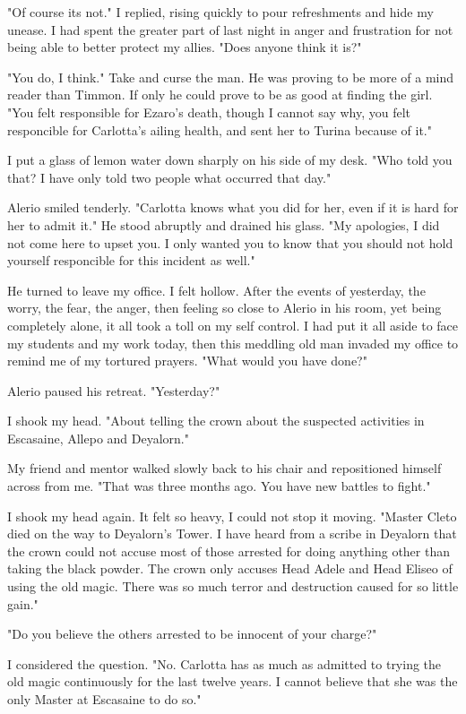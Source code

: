 \documentclass{article}
\begin{document}
"Of course its not." I replied, rising quickly to pour refreshments and hide my unease. I had spent the greater part of last night in anger and frustration for not being able to better protect my allies. "Does anyone think it is?"

"You do, I think." Take and curse the man. He was proving to be more of a mind reader than Timmon. If only he could prove to be as good at finding the girl. "You felt responsible for Ezaro's death, though I cannot say why, you felt responcible for Carlotta's ailing health, and sent her to Turina because of it."

I put a glass of lemon water down sharply on his side of my desk. "Who told you that? I have only told two people what occurred that day."

Alerio smiled tenderly. "Carlotta knows what you did for her, even if it is hard for her to admit it." He stood abruptly and drained his glass. "My apologies, I did not come here to upset you. I only wanted you to know that you should not hold yourself responcible for this incident as well."

He turned to leave my office. I felt hollow. After the events of yesterday, the worry, the fear, the anger, then feeling so close to Alerio in his room, yet being completely alone, it all took a toll on my self control. I had put it all aside to face my students and my work today, then this meddling old man invaded my office to remind me of my tortured prayers. "What would you have done?"

Alerio paused his retreat. "Yesterday?"

I shook my head. "About telling the crown about the suspected activities in Escasaine, Allepo and Deyalorn."

My friend and mentor walked slowly back to his chair and repositioned himself across from me. "That was three months ago. You have new battles to fight."

I shook my head again. It felt so heavy, I could not stop it moving. "Master Cleto died on the way to Deyalorn's Tower. I have heard from a scribe in Deyalorn that the crown could not accuse most of those arrested for doing anything other than taking the black powder. The crown only accuses Head Adele and Head Eliseo of using the old magic. There was so much terror and destruction caused for so little gain."

"Do you believe the others arrested to be innocent of your charge?"

I considered the question. "No. Carlotta has as much as admitted to trying the old magic continuously for the last twelve years. I cannot believe that she was the only Master at Escasaine to do so."
\end{document}
